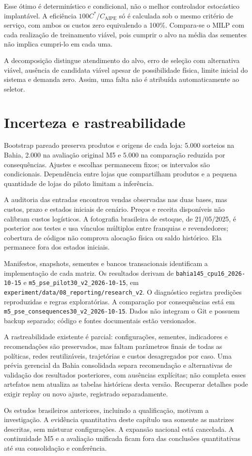 Esse ótimo é determinístico e condicional, não o melhor controlador estocástico implantável. A eficiência $100C^*/C_{\mathrm{AIPE}}$ só é calculada sob o mesmo critério de serviço, com ambos os custos zero equivalendo a 100\%. Compara-se o MILP com cada realização de treinamento viável, pois cumprir o alvo na média das sementes não implica cumpri-lo em cada uma.

A decomposição distingue atendimento do alvo, erro de seleção com alternativa viável, ausência de candidata viável apesar de possibilidade física, limite inicial do sistema e demanda zero. Assim, uma falta não é atribuída automaticamente ao seletor.

\section{Incerteza e rastreabilidade}
\label{sec:protocolo_exp}\label{sec:reporting}\label{app:reproducibility}
Bootstrap pareado preserva produtos e origens de cada loja: 5.000 sorteios na Bahia, 2.000 na avaliação original M5 e 5.000 na comparação reduzida por consequências. Ajustes e escolhas permanecem fixos; os intervalos são condicionais. Dependência entre lojas que compartilham produtos e a pequena quantidade de lojas do piloto limitam a inferência.

A auditoria das entradas encontrou vendas observadas nas duas bases, mas custos, prazo e estados iniciais de cenário. Preços e receita disponíveis não calibram custos logísticos. A fotografia brasileira de estoque, de 21/05/2025, é posterior aos testes e usa vínculos múltiplos entre franquias e revendedores; cobertura de códigos não comprova alocação física ou saldo histórico. Ela permanece fora dos estados iniciais.

Manifestos, snapshots, sementes e bancos transacionais identificam a implementação de cada matriz. Os resultados derivam de \nolinkurl{bahia145_cpu16_2026-10-15} e \nolinkurl{m5_pse_pilot30_v2_2026-10-15}, em \nolinkurl{experiment/data/08_reporting/research_v2}. O diagnóstico registra predições reproduzidas e regras exploratórias. A comparação por consequências está em \nolinkurl{m5_pse_consequences30_v2_2026-10-15}. Dados não integram o Git e possuem backup separado; código e fontes documentais estão versionados.

A rastreabilidade existente é parcial: configurações, sementes, indicadores e recomendações são preservados, mas faltam parâmetros finais de todas as políticas, redes reutilizáveis, trajetórias e custos desagregados por caso. Uma prévia gerencial da Bahia consolidada separa recomendação e alternativas de validação dos resultados posteriores, com ausências explícitas; não completa esses artefatos nem atualiza as tabelas históricas desta versão. Recuperar detalhes pode exigir replay ou novo ajuste, registrado separadamente.

Os estudos brasileiros anteriores, incluindo a qualificação, motivam a investigação. A evidência quantitativa deste capítulo usa somente as matrizes descritas, sem misturar configurações. A expansão nacional está cancelada. A continuidade M5 e a avaliação unificada ficam fora das conclusões quantitativas até sua consolidação e conferência.
